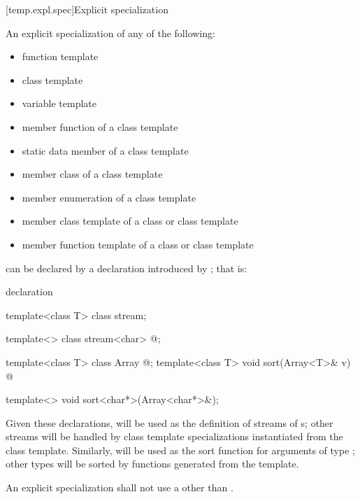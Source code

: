 [temp.expl.spec]{Explicit specialization}

\pnum
{}%
An explicit specialization of any of the following:
\begin{itemize}
\item
function template
\item
class template
\item
variable template
\item
member function of a class template
\item
static data member of a class template
\item
member class of a class template
\item
member enumeration of a class template
\item
member class template of a class or class template
\item
member function template of a class or class template
\end{itemize}
can be declared by a declaration introduced by
;
that is:
%

\begin{bnf}
\br
   \terminal{<} \terminal{>} declaration
\end{bnf}

\begin{example}
\begin{codeblock}
template<class T> class stream;

template<> class stream<char> { @\commentellip@ };

template<class T> class Array { @\commentellip@ };
template<class T> void sort(Array<T>& v) { @\commentellip@ }

template<> void sort<char*>(Array<char*>&);
\end{codeblock}

Given these declarations,
will be used as the definition of streams of
s;
other streams will be handled by class template specializations instantiated
from the class template.
Similarly,
will be used as the sort function for arguments
of type
;
other
types will be sorted by functions generated from the template.
\end{example}

\pnum
An explicit specialization shall not use
a 
other than .


